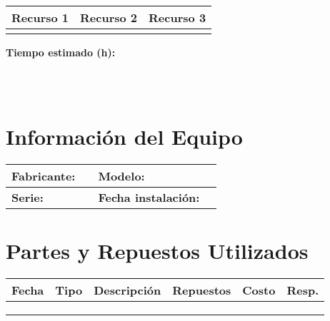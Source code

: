 \documentclass[10pt,a4paper]{article}
\begin{document}
\vspace{0.3cm}

\\[4pt]
\begin{tabular}{|>{}P{0.30\textwidth}|>{}P{0.30\textwidth}|>{}P{0.30\textwidth}|}
\hline
    \textbf{Recurso 1} & \textbf{Recurso 2} & \textbf{Recurso 3} \\[8pt]
\hline
 & & \\[12pt]
\hline
\end{tabular}

\vspace{0.08cm}

\noindent\textbf{Tiempo estimado (h):} \hrulefill

\vspace{0.08cm}

\\[4pt]
\begin{tabular}{|>{}P{0.92\textwidth}|}
\hline
\rule{0pt}{4.5cm}\\
\hline
\end{tabular}

\vspace{0.08cm}

\section*{\color{darkblue}Información del Equipo}
\begin{tabular}{|>{}P{0.23\textwidth}|P{0.23\textwidth}|>{}P{0.23\textwidth}|P{0.23\textwidth}|}
\hline
    \textbf{Fabricante:} & & \textbf{Modelo:} & \\[8pt]
\hline
    \textbf{Serie:} & & \textbf{Fecha instalación:} & \\[8pt]
\hline
\end{tabular}

\vspace{0.08cm}

\section*{\color{darkblue}Partes y Repuestos Utilizados}
\begin{tabular}{|>{}C{0.08\textwidth}|>{}C{0.08\textwidth}|>{}P{0.40\textwidth}|>{}C{0.12\textwidth}|>{}C{0.10\textwidth}|>{}C{0.10\textwidth}|}
\hline
    \textbf{Fecha} & \textbf{Tipo} & \textbf{Descripción} & \textbf{Repuestos} & \textbf{Costo} & \textbf{Resp.} \\[8pt]
\hline
 & & & & & \\[8pt]
\hline
 & & & & & \\[8pt]
\hline
 & & & & & \\[8pt]
\hline
\end{tabular}
\end{document}
